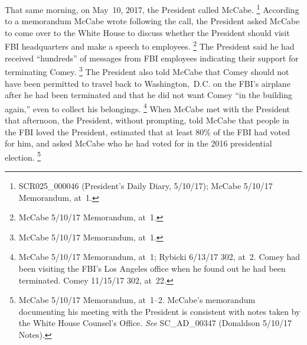 That same morning, on May~10, 2017, the President called McCabe.%
\footnote{SCR025\_000046 (President's Daily Diary, 5/10/17);
McCabe 5/10/17 Memorandum, at~1.}
According to a memorandum McCabe wrote following the call, the President asked McCabe to come over to the White House to discuss whether the President should visit FBI headquarters and make a speech to employees.%
\footnote{McCabe 5/10/17 Memorandum, at~1.}
The President said he had received ``hundreds'' of messages from FBI employees indicating their support for terminating Comey.%
\footnote{McCabe 5/10/17 Memorandum, at~1.}
The President also told McCabe that Comey should not have been permitted to travel back to Washington,~D.C. on the FBI's airplane after he had been terminated and that he did not want Comey ``in the building again,'' even to collect his belongings.%
\footnote{McCabe 5/10/17 Memorandum, at~1;
Rybicki 6/13/17 302, at~2.
Comey had been visiting the FBI's Los Angeles office when he found out he had been terminated.
Comey 11/15/17 302, at~22.}
When McCabe met with the President that afternoon, the President, without prompting, told McCabe that people in the FBI loved the President, estimated that at least 80\% of the FBI had voted for him, and asked McCabe who he had voted for in the 2016 presidential election.%
\footnote{McCabe 5/10/17 Memorandum, at~1--2.
McCabe's memorandum documenting his meeting with the President is consistent with notes taken by the White House Counsel's Office.
\textit{See} SC\_AD\_00347 (Donaldson 5/10/17 Notes).}

